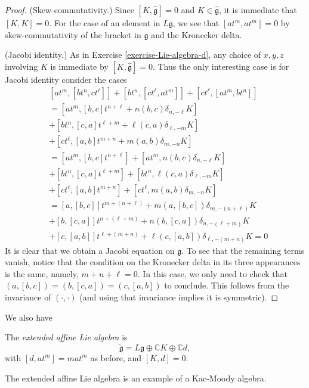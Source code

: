\begin{proof}
(Skew-commutativity.) 
Since $[K,\hat{\mathfrak{g}}]=0$ and $K \in \hat{\mathfrak{g}}$, 
it is immediate that $[K,K]=0$. 
For the case of an element in $L\mathfrak{g}$, we see that
$[at^m,at^m]=0$ by skew-commutativity of the bracket in $\mathfrak{g}$ 
and the Kronecker delta.
 
(Jacobi identity.) As in Exercise \ref{exercise-Lie-algebra-d}, 
any choice of $x,y,z$ involving $K$ is immediate by $[K,\hat{\mathfrak{g}}]=0$.
Thus the only interesting case is
for Jacobi identity consider the cases
\begin{align*}
& [at^m,[bt^n,ct^\ell]]+[bt^n,[ct^\ell,at^m]]+[ct^\ell,[at^m,bt^n]]\\
&=[at^m,[b,c]t^{n+\ell}+n(b,c)\delta_{n,-\ell}K]\\
&+[bt^n,[c,a]t^{\ell+m}+\ell(c,a)\delta_{\ell,-m}K]\\
&+[ct^\ell,[a,b]t^{m+n}+m(a,b)\delta_{m,-n}K]\\
&=[at^m,[b,c]t^{n+\ell}]+[at^m,n(b,c)\delta_{n,-\ell}K]\\
&+[bt^n,[c,a]t^{\ell+m}]+[bt^n,\ell(c,a)\delta_{\ell,-m}K]\\
&+[ct^\ell,[a,b]t^{m+n}]+[ct^\ell,m(a,b)\delta_{m,-n}K]\\
&=[a,[b,c]]t^{m+(n+\ell)}+m(a,[b,c])\delta_{m,-(n+\ell)}K\\
&+[b,[c,a]]t^{n+(\ell+m)}+n(b,[c,a])\delta_{n,-(\ell+m)}K\\
&+[c,[a,b]]t^{\ell+(m+n)}+\ell(c,[a,b])\delta_{\ell,-(m+n)}K=0
\end{align*}
It is clear that we obtain a Jacobi equation on $\mathfrak{g}$. To see that the
remaining terms vanish, notice that the condition on
the Kronecker delta in its three appearances is the same,
namely, $m+n+\ell=0$. In this case, we only need to check
that $(a,[b,c])=(b,[c,a])=(c,[a,b])$ to conclude.
This follows from the invariance of $(\cdot,\cdot)$
(and using that invariance implies it is symmetric).
\end{proof}

We also have
\begin{definition}
\label{definition-extended-affine-Lie-algebra}
The {\it extended affine Lie algebra} is 
$$
\tilde{\mathfrak{g}}=L\mathfrak{g} \oplus \mathbb{C}K \oplus \mathbb{C}d,
$$ 
with $[d,at^m]=m a t^m$ as before, and 
$[K,d]=0$.
\end{definition}

The extended affine Lie algebra is an example of a Kac-Moody algebra.

